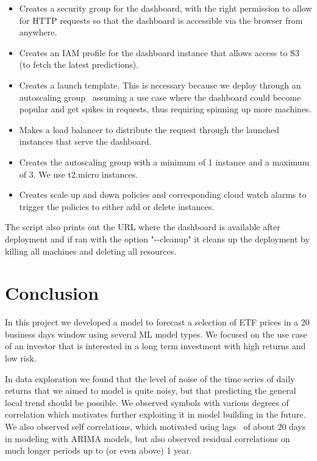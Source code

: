 \documentclass[10pt]{article}
\providecommand{\tightlist}{\setlength{\itemsep}{0pt}\setlength{\parskip}{0pt}}%
\begin{document}
\begin{itemize}
\tightlist
\item
  Creates a security group for the dashboard, with the right permission
  to allow for HTTP requests so that the dashboard is accessible via the
  browser from anywhere.
\item
  Creates an IAM profile for the dashboard instance that allows access
  to S3 (to fetch the latest predictions).
\item
  Creates a launch template. This is necessary because we deploy through
  an autoscaling group~ assuming a use case where the dashboard could
  become popular and get spikes in requests, thus requiring spinning up
  more machines.
\item
  Makes a load balancer to distribute the request through the launched
  instances that serve the dashboard.
\item
  Creates the autoscaling group with a minimum of 1 instance and a
  maximum of 3. We use t2.micro instances.
\item
  Creates scale up and down policies and corresponding cloud watch
  alarms to trigger the policies to either add or delete instances.
\end{itemize}

The script also prints out the URL where the dashboard is available
after deployment and if ran with the option "-\/-cleanup" it cleans up
the deployment by killing all machines and deleting all resources.

\hypertarget{conclusion}{%
\section{Conclusion}}

{\label{370266}}

In this project we developed a model to forecast a selection of ETF
prices in a 20 business days window using several ML model types. We
focused on the use case of an investor that is interested in a long term
investment with high returns and low risk.

In data exploration we found that the level of noise of the time series
of daily returns that we aimed to model is quite noisy, but that
predicting the general local trend should be possible. We observed
symbols with various degrees of correlation which motivates further
exploiting it in model building in the future. We also observed self
correlations, which motivated using lags~ of about 20 days in modeling
with ARIMA models, but also observed residual correlations on much
longer periods up to (or even above) 1 year.~
\end{document}
